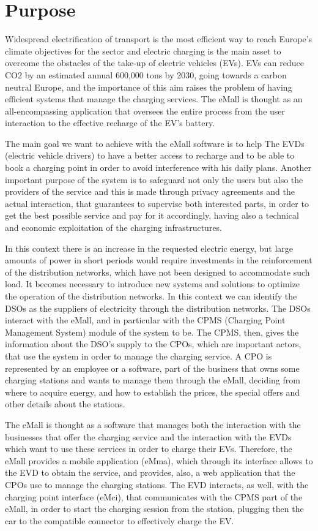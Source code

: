 \section{Purpose}
\label{sec:purpose}%
Widespread electrification of transport is the most efficient way to reach Europe’s climate objectives for the sector and electric charging is the main asset to overcome the obstacles of the take-up of electric vehicles (EVs). EVs can reduce CO2 by an estimated annual 600,000 tons by 2030, going towards a carbon neutral Europe, and the importance of this aim raises the problem of having efficient systems that manage the charging services. The eMall is thought as an all-encompassing application that oversees the entire process from the user interaction to the effective recharge of the EV's battery.

The main goal we want to achieve with the eMall software is to help The EVDs (electric vehicle drivers) to have a better access to recharge and to be able to book a charging point in order to avoid interference with his daily plans. Another important purpose of the system is to safeguard not only the users but also the providers of the service and this is made through privacy agreements and the actual interaction, that guarantees to supervise both interested parts, in order to get the best possible service and pay for it accordingly, having also a technical and economic exploitation of the charging infrastructures.

In this context there is an increase in the requested electric energy, but large amounts of power in short periods would require investments in the reinforcement of the distribution networks, which have not been designed to accommodate such load. It becomes necessary to introduce new systems and solutions to optimize the operation of the distribution networks. In this context we can identify the DSOs as the suppliers of electricity through the distribution networks. The DSOs interact with the eMall, and in particular with the CPMS (Charging Point Management System) module of the system to be. The CPMS, then, gives the information about the DSO's supply to the CPOs, which are important actors, that use the system in order to manage the charging service. A CPO is represented by an employee or a software, part of the business that owns some charging stations and wants to manage them through the eMall, deciding from where to acquire energy, and how to establish the prices, the special offers and other details about the stations.

The eMall is thought as a software that manages both the interaction with the businesses that offer the charging service and the interaction with the EVDs which want to use these services in order to charge their EVs. Therefore, the eMall provides a mobile application (eMma), which through its interface allows to the EVD to obtain the service, and provides, also, a web application that the CPOs use to manage the charging stations. The EVD interacts, as well, with the charging point interface (eMci), that communicates with the CPMS part of the eMall, in order to start the charging session from the station, plugging then the car to the compatible connector to effectively charge the EV.


